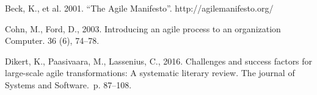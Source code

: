\renewcommand{\baselinestretch}{1.0}
\setlength{\parskip}{0.5em}

Beck, K., et al. 2001. ``The Agile Manifesto''.
http://agilemanifesto.org/

Cohn, M., Ford, D., 2003. Introducing an agile process to an
organization Computer. 36 (6), 74–78.

Dikert, K., Paasivaara, M., Lassenius, C., 2016. Challenges and success factors
for large-scale agile transformations: A systematic literary review. The journal
of Systems and Software.\ p. 87–108.
